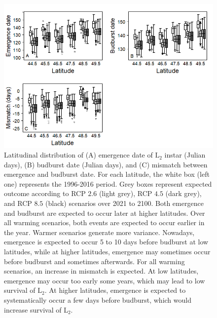 \documentclass[12 pt]{article}
\begin{document}
\begin{figure}
    \centering
    \includegraphics[width = 17 cm, keepaspectratio]{Total_Boxplots}
    \caption{Latitudinal distribution of (A) emergence date of $\text{L}_2$ instar (Julian days), (B) budburst date (Julian days), and (C) mismatch between emergence and budburst date. For each latitude, the white box (left one) represents the 1996-2016 period. Grey boxes represent expected outcome according to RCP $2.6$ (light grey), RCP $4.5$ (dark grey), and RCP $8.5$ (black) scenarios over 2021 to 2100.  Both emergence and budburst are expected to occur later at higher latitudes. Over all warming scenarios, both events are expected to occur earlier in the year. Warmer scenarios generate more variance. Nowadays, emergence is expected to occur 5 to 10 days before budburst at low latitudes, while at higher latitudes, emergence may sometimes occur before budburst and sometimes afterwards.  For all warming scenarios, an increase in mismatch is expected. At low latitudes, emergence may occur too early some years, which may lead to low survival of $\text{L}_2$. At higher latitudes, emergence is expected to systematically occur a few days before budburst, which would increase survival of $\text{L}_2$.}
\end{figure}
\end{document}
